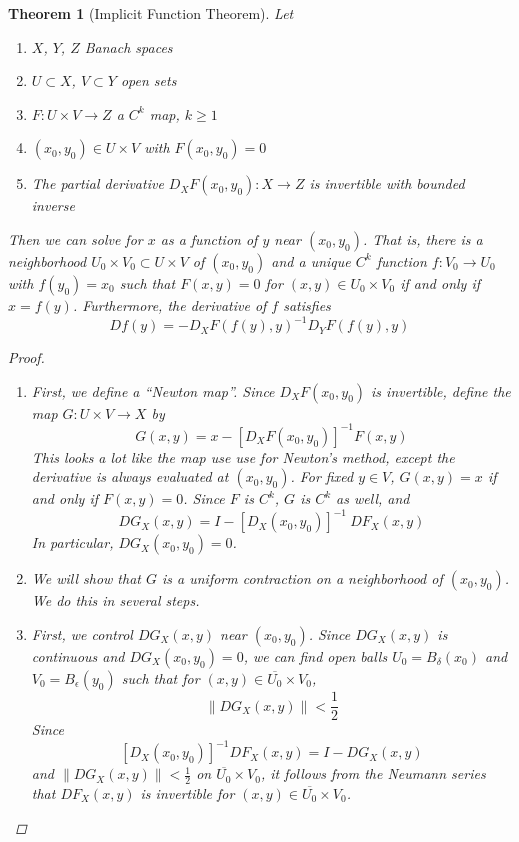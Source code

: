\documentclass[12pt]{amsart}         %
\newtheorem{theorem}{Theorem}[section]
\theoremstyle{remark}
\begin{document}
\begin{theorem}[Implicit Function Theorem]
Let
\begin{enumerate}
\item $X$, $Y$, $Z$ Banach spaces
\item $U \subset X$, $V \subset Y$ open sets
\item $F: U \times V \rightarrow Z$ a $C^k$ map, $k \geq 1$
\item $(x_0, y_0) \in U \times V$ with $F(x_0, y_0) = 0$
\item The partial derivative $D_X F(x_0, y_0): X \rightarrow Z$ is invertible with bounded inverse
\end{enumerate}
Then we can solve for $x$ as a function of $y$ near $(x_0, y_0)$. That is, there is a neighborhood $U_0 \times V_0 \subset U \times V$ of $(x_0, y_0)$ and a unique $C^k$ function $f: V_0 \rightarrow U_0$ with $f(y_0) = x_0$ such that $F(x, y) = 0$ for $(x, y) \in U_0 \times V_0$ if and only if $x = f(y)$. Furthermore, the derivative of $f$ satisfies
\[
Df(y) = -D_X F(f(y),y)^{-1} D_Y F(f(y),y)
\]

\begin{proof}
\begin{enumerate}
\item First, we define a ``Newton map''. Since $D_X F(x_0, y_0)$ is invertible, define the map $G: U \times V \rightarrow X$ by 
\begin{equation}\label{defG}
G(x, y) = x - [D_X F(x_0, y_0)]^{-1} F(x, y)
\end{equation}
This looks a lot like the map use use for Newton's method, except the derivative is always evaluated at $(x_0, y_0)$. For fixed $y \in V$, $G(x, y) = x$ if and only if $F(x, y) = 0$. Since $F$ is $C^k$, $G$ is $C^k$ as well, and
\[
DG_X(x, y) = I - [D_X(x_0, y_0)]^{-1} \: DF_X(x, y)
\]
In particular, $DG_X(x_0, y_0) = 0$.

\item We will show that $G$ is a uniform contraction on a neighborhood of $(x_0, y_0)$. We do this in several steps.

\item First, we control $DG_X(x, y)$ near $(x_0, y_0)$. Since $DG_X(x, y)$ is continuous and $DG_X(x_0, y_0) = 0$, we can find open balls $U_0 = B_\delta(x_0)$ and $V_0 = B_\epsilon(y_0)$ such that for $(x, y) \in \overline{U_0} \times V_0$,
\[
\|DG_X(x, y)\| < \frac{1}{2} 
\]
Since 
\[
[D_X(x_0, y_0)]^{-1} DF_X(x, y) = I - DG_X(x, y)
\]
and $\|DG_X(x, y)\| < \frac{1}{2}$ on $\overline{U_0} \times V_0$, it follows from the Neumann series that $DF_X(x, y)$ is invertible for $(x, y) \in \overline{U_0} \times V_0$.


\end{enumerate}
\end{proof}
\end{theorem}
\end{document}

